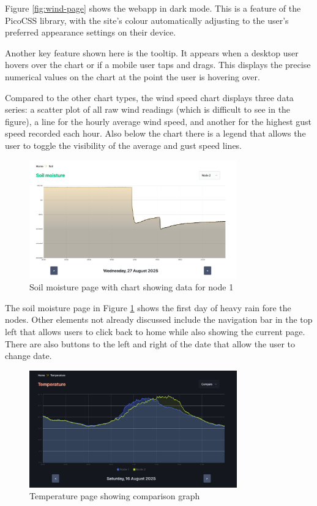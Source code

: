 Figure \ref{fig:wind-page} shows the webapp in dark mode. This is a feature of
the PicoCSS library, with the site's colour automatically adjusting to the
user's preferred appearance settings on their device.

Another key feature shown here is the tooltip. It appears when a desktop user
hovers over the chart or if a mobile user taps and drags. This displays the
precise numerical values on the chart at the point the user is hovering over.

Compared to the other chart types, the wind speed chart displays three data
series: a scatter plot of all raw wind readings (which is difficult to see in
the figure), a line for the hourly average wind speed, and another for the
highest gust speed recorded each hour. Also below the chart there is a legend
that allows the user to toggle the visibility of the average and gust speed
lines.

\begin{figure}[H]
    \centering
    \includegraphics[width=0.8\textwidth]{contents/part-3/fig3/soil-moisture-light.jpg}
    \caption{Soil moisture page with chart showing data for node 1}
    \label{fig:soil-page}
\end{figure}

The soil moisture page in Figure \ref{fig:soil-page} shows the first day of
heavy rain fore the nodes. Other elements not already discussed include the
navigation bar in the top left that allows users to click back to home while
also showing the current page. There are also buttons to the left and right of
the date that allow the user to change date.

\begin{figure}[H]
    \centering
    \includegraphics[width=0.8\textwidth]{contents/part-3/fig3/compare-mode.jpg}
    \caption{Temperature page showing comparison graph}
    \label{fig:compare-page}
\end{figure}

